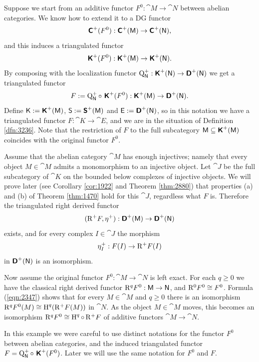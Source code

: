 \begin{exa} \label{exa:1305}
Suppose we start from an additive functor 
$F^0 : \cat{M} \to \cat{N}$
between abelian categories. We know how to extend it to a DG functor 
\[ \operatorname{\boldsymbol{\mathsf{C}}}^{+}(F^0) : \operatorname{\boldsymbol{\mathsf{C}}}^{+}(\operatorname{\mathsf{M}}) \to \operatorname{\boldsymbol{\mathsf{C}}}^{+}(\operatorname{\mathsf{N}}) , \]
and this induces a triangulated functor 
\[ \operatorname{\boldsymbol{\mathsf{K}}}^{+}(F^0) : \operatorname{\boldsymbol{\mathsf{K}}}^{+}(\operatorname{\mathsf{M}}) \to  \operatorname{\boldsymbol{\mathsf{K}}}^{+}(\operatorname{\mathsf{N}}) . \]
By composing with the localization functor 
$\operatorname{Q}^+_{\operatorname{\mathsf{N}}} : \operatorname{\boldsymbol{\mathsf{K}}}^{+}(\operatorname{\mathsf{N}}) \to \operatorname{\boldsymbol{\mathsf{D}}}^{+}(\operatorname{\mathsf{N}})$
we get a triangulated functor 
\begin{equation} \label{eqn:5030}
F := \operatorname{Q}^+_{\operatorname{\mathsf{N}}} \circ \, \operatorname{\boldsymbol{\mathsf{K}}}^{+}(F^0) : \operatorname{\boldsymbol{\mathsf{K}}}^{+}(\operatorname{\mathsf{M}}) 
\to \operatorname{\boldsymbol{\mathsf{D}}}^{+}(\operatorname{\mathsf{N}}) .
\end{equation}
Define $\operatorname{\mathsf{K}} := \operatorname{\boldsymbol{\mathsf{K}}}^{+}(\operatorname{\mathsf{M}})$,
$\operatorname{\mathsf{S}} := \operatorname{\boldsymbol{\mathsf{S}}}^{+}(\operatorname{\mathsf{M}})$ and  
$\operatorname{\mathsf{E}} := \operatorname{\boldsymbol{\mathsf{D}}}^{+}(\operatorname{\mathsf{N}})$, so in this notation we have a triangulated 
functor $F : \cat{K} \to \cat{E}$, and we are in the situation of Definition 
\ref{dfn:3236}. Note that the restriction of $F$ to the full subcategory 
$\operatorname{\mathsf{M}} \subseteq \operatorname{\boldsymbol{\mathsf{K}}}^{+}(\operatorname{\mathsf{M}})$ coincides with the original functor $F^0$. 

Assume that the abelian category $\cat{M}$ has enough injectives; namely 
that every object $M \in \cat{M}$ admits a monomorphism to an injective object. 
Let $\cat{J}$ be the full subcategory of $\cat{K}$ on the bounded below 
complexes of injective objects. 
We will prove later (see Corollary \ref{cor:1922} and Theorem \ref{thm:2880}) 
that properties (a) and (b) of Theorem \ref{thm:1470} hold 
for this $\cat{J}$, regardless what $F$ is. 
Therefore the triangulated right derived functor 
\begin{equation} \label{eqn:5031}
(\mathrm{R}^+ F, \eta^+) : \operatorname{\boldsymbol{\mathsf{D}}}^{+}(\operatorname{\mathsf{M}}) \to \operatorname{\boldsymbol{\mathsf{D}}}^{+}(\operatorname{\mathsf{N}})
\end{equation}
exists, and for every complex $I \in \cat{J}$ the morphism 
\begin{equation} \label{eqn:2347}
\eta^+_I : F(I) \to \mathrm{R}^+ F(I) 
\end{equation}
in $\operatorname{\boldsymbol{\mathsf{D}}}^{+}(\operatorname{\mathsf{N}})$ is an isomorphism. 

Now assume the original functor $F^0 : \cat{M} \to \cat{N}$ is left exact.
For each $q \geq 0$ we have the classical right derived functor
$\mathrm{R}^q F^0 : \operatorname{\mathsf{M}} \to \operatorname{\mathsf{N}}$, and $\mathrm{R}^0 F^0 \cong F^0$. 
Formula (\ref{eqn:2347}) shows that for every $M \in \cat{M}$ and $q \geq 0$ 
there is an isomorphism
$\mathrm{R}^q F^0(M) \cong \operatorname{H}^q(\mathrm{R}^+ F(M))$  
in $\cat{N}$. As the object $M \in \cat{M}$ moves,
this becomes an isomorphism 
$\mathrm{R}^q F^0 \cong \operatorname{H}^q \circ \, \mathrm{R}^+ F$
of additive functors $\cat{M} \to \cat{N}$.

In this example we were careful to use distinct notations for the functor 
$F^0$ between abelian categories, and the induced triangulated functor 
$F = \operatorname{Q}^+_{\operatorname{\mathsf{N}}} \circ \, \operatorname{\boldsymbol{\mathsf{K}}}^{+}(F^0)$.
Later we will use the same notation for $F^0$ and $F$. 
\end{exa}


